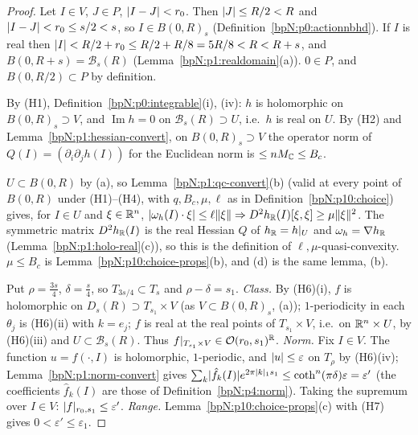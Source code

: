 \begin{proof}
\label{stepN:p10:hc-tubes} Let $I\in V$, $J\in P$, $\lvert I-J\rvert<r_0$. Then $\lvert J\rvert\le R/2<R$ and $\lvert I-J\rvert<r_0\le s/2<s$, so $I\in B(0,R)_s$ (Definition~\ref{bpN:p0:actionnbhd}). If $I$ is real then $\lvert I\rvert<R/2+r_0\le R/2+R/8=5R/8<R<R+s$, and $B(0,R+s)=\mathcal B_s(R)$ (Lemma~\ref{bpN:p1:realdomain}(a)). $0\in P$, and $B(0,R/2)\subset P$ by definition.

\label{stepN:p10:hc-h} By (H1), Definition~\ref{bpN:p0:integrable}(i), (iv): $h$ is holomorphic on $B(0,R)_s\supset V$, and $\operatorname{Im}h=0$ on $\mathcal B_s(R)\supset U$, i.e.\ $h$ is real on $U$. By (H2) and Lemma~\ref{bpN:p1:hessian-convert}, on $B(0,R)_s\supset V$ the operator norm of $Q(I)=(\partial_i\partial_jh(I))$ for the Euclidean norm is $\le nM_{\mathbb{C}}\le B_c$.

\label{stepN:p10:hc-qc} $U\subset B(0,R)$ by (a), so Lemma~\ref{bpN:p1:qc-convert}(b) (valid at every point of $B(0,R)$ under (H1)--(H4), with $q,B_c,\mu,\ell$ as in Definition~\ref{bpN:p10:choice}) gives, for $I\in U$ and $\xi\in\mathbb{R}^n$, $\lvert \omega_h(I)\cdot\xi\rvert\le\ell\lVert \xi\rVert\Rightarrow D^2h_{\mathbb{R}}(I)[\xi,\xi]\ge\mu\lVert \xi\rVert^2$. The symmetric matrix $D^2h_{\mathbb{R}}(I)$ is the real Hessian $Q$ of $h_{\mathbb{R}}=h|_U$ and $\omega_h=\nabla h_{\mathbb{R}}$ (Lemma~\ref{bpN:p1:holo-real}(c)), so this is the definition of $\ell,\mu$-quasi-convexity. $\mu\le B_c$ is Lemma~\ref{bpN:p10:choice-props}(b), and (d) is the same lemma, (b).

\label{stepN:p10:hc-f} Put $\rho=\frac{3s}4$, $\delta=\frac s4$, so $T_{3s/4}\subset T_s$ and $\rho-\delta=s_1$. \emph{Class.} By (H6)(i), $f$ is holomorphic on $D_s(R)\supset T_{s_1}\times V$ (as $V\subset B(0,R)_s$, (a)); $1$-periodicity in each $\theta_j$ is (H6)(ii) with $k=e_j$; $f$ is real at the real points of $T_{s_1}\times V$, i.e.\ on $\mathbb{R}^n\times U$, by (H6)(iii) and $U\subset\mathcal B_s(R)$. Thus $f|_{T_{s_1}\times V}\in\mathcal O(r_0,s_1)^{\mathbb{R}}$. \emph{Norm.} Fix $I\in V$. The function $u=f(\cdot,I)$ is holomorphic, $1$-periodic, and $\lvert u\rvert\le\varepsilon$ on $T_\rho$ by (H6)(iv); Lemma~\ref{bpN:p1:norm-convert} gives $\sum_k\lvert \hat f_k(I)\rvert e^{2\pi\lvert k\rvert_1s_1}\le\coth^n(\pi\delta)\varepsilon=\varepsilon'$ (the coefficients $\hat f_k(I)$ are those of Definition~\ref{bpN:p4:norm}). Taking the supremum over $I\in V$: $\lvert f\rvert_{r_0,s_1}\le\varepsilon'$. \emph{Range.} Lemma~\ref{bpN:p10:choice-props}(c) with (H7) gives $0<\varepsilon'\le\varepsilon_1$.


\end{proof}
